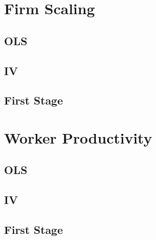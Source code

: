 \documentclass{article}
\newcommand{\resultsdir}{../results/raw}
\begin{document}
\section{Firm Scaling}

\subsection{OLS}


\subsection{IV}


\subsection{First Stage}


\section{Worker Productivity}

\subsection{OLS}


\subsection{IV}


\subsection{First Stage}

\end{document}
